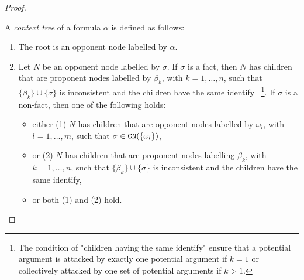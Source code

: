 \begin{proof}
\begin{definition} 
A \emph{context tree} of a formula $\alpha$ is defined as follows:
\begin{enumerate}
    \item The root is an opponent node labelled by $\alpha$.
    \item Let $N$ be an opponent node labelled by $\sigma$. If $\sigma$ is a fact, then $N$ has children that are proponent nodes labelled by $\beta_k$, with $k = 1, \ldots, n$, such that $\{ \beta_k \} \cup \{ \sigma \}$ is inconsistent and the children have the same identify ~\footnote{The condition of "children having the same identify" ensure that a potential argument is attacked by exactly one potential argument if $k = 1$ or collectively attacked by one set of potential arguments if $k > 1$.}.
     If $\sigma$ is a non-fact, then one of the following holds:
     \begin{itemize}
         \item either (1) $N$ has children that are opponent nodes labelled by $\omega_l$, with $l = 1, \dots, m$, such that $\sigma \in \texttt{\textup{CN}}(\{ \omega_l \})$,
         \item or (2) $N$ has children that are proponent nodes labelling $\beta_k$, with $k = 1, \ldots, n$, such that $\{ \beta_k \} \cup \{ \sigma \}$ is inconsistent and the children have the same identify,
         \item or both (1) and (2) hold.
     \end{itemize}
\end{enumerate}
   
\end{definition}




\end{proof}

